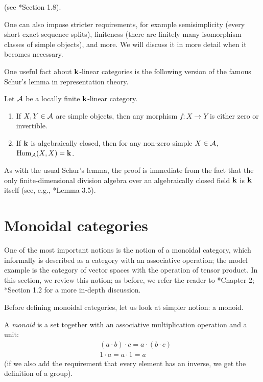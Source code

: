 (see *{Section 1.8}).

One can also impose stricter requirements, for example semisimplicity (every
short exact sequence splits), finiteness (there are finitely many isomorphism
classes of simple objects), and more. We will discuss it in more detail when it
becomes necessary.

One useful fact about $\mathbf{k}$-linear categories is the following version of the
famous Schur's lemma in representation theory.

\begin{lemma}\label{l:schur}
  Let $\mathcal{A}$ be a locally finite $\mathbf{k}$-linear category.

  \begin{enumerate}
    \item If $X,Y\in \mathcal{A}$ are simple objects, then any morphism
      $f\colon X\to Y$ is either zero or invertible.
    \item If $\mathbf{k}$ is algebraically closed, then for any non-zero
      simple $X\in \mathcal{A}$, $\operatorname{Hom}_{\mathcal{A}}(X,X)=\mathbf{k}$.
  \end{enumerate}

\end{lemma}
As with the usual Schur's lemma, the proof is immediate from the fact that the
only  finite-dimensional division algebra over an algebraically closed field
$\mathbf{k}$ is $\mathbf{k}$ itself (see, e.g., *{Lemma 3.5}).

\section{Monoidal categories}\label{s:monoidal}
One of the most important notions is the notion of a monoidal category, which
informally is described as a category with an associative operation; the model
example is the category of vector spaces with the operation of tensor product.
In this section, we review this notion; as before, we refer the reader to
*{Chapter 2}; *{Section 1.2} for a more
in-depth discussion.

Before defining monoidal categories, let us look at simpler notion: a monoid.

A \emph{monoid} is a set together with an associative
multiplication operation and a unit:
\begin{align*}
  &(a\cdot b)\cdot c = a\cdot (b\cdot c)\\
  &1\cdot a = a\cdot 1 = a
\end{align*}
(if we also add the requirement that every element has an inverse,
we get the definition of a group).

